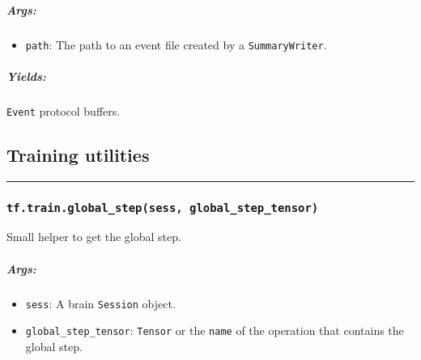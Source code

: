 \subparagraph{Args: }\label{args-40}

\begin{itemize}
\tightlist
\item
  \texttt{path}: The path to an event file created by a
  \texttt{SummaryWriter}.
\end{itemize}

\subparagraph{Yields: }\label{yields}

\texttt{Event} protocol buffers.

\subsection{Training utilities }\label{training-utilities}

\begin{center}\rule{0.5\linewidth}{\linethickness}\end{center}

\subsubsection{\texorpdfstring{\texttt{tf.train.global\_step(sess,\ global\_step\_tensor)}
}{tf.train.global\_step(sess, global\_step\_tensor) }}\label{tf.train.globalux5fstepsess-globalux5fstepux5ftensor}

Small helper to get the global step.

\begin{Shaded}
\begin{Highlighting}[]
\OperatorTok{=} \OperatorTok{=}\OperatorTok{=}\NormalTok{)}
\OperatorTok{=} 
 

\end{Highlighting}
\end{Shaded}

\subparagraph{Args: }\label{args-41}

\begin{itemize}
\tightlist
\item
  \texttt{sess}: A brain \texttt{Session} object.
\item
  \texttt{global\_step\_tensor}: \texttt{Tensor} or the \texttt{name} of
  the operation that contains the global step.
\end{itemize}

